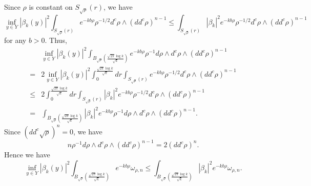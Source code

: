 \documentclass[12pt,oneside]{amsart}
\theoremstyle{plain}
\theoremstyle{definition}
\theoremstyle{remark}
\begin{document}
Since $\rho$ is constant on $S_{\sqrt{\rho}}(r)$, we have 
\[
\inf_{y \in Y} |\beta_{k}(y)|^2 \int_{S_{\sqrt{\rho}}(r)} e^{-kb\rho} \rho^{-1/2}d^{c} \rho \wedge (dd^c \rho)^{n-1} \leq \int_{S_{\sqrt{\rho}}(r)} |\beta_{k}|^2 e^{-k b\rho} \rho^{-1/2}d^c \rho \wedge (dd^c \rho)^{n-1} 
\]
for any $b > 0$.  
Thus, 
\begin{align*}
& \inf_{y \in Y} |\beta_{k}(y)|^2 \int_{B_{\sqrt{\rho}}(\frac{\sqrt{2\pi}\log k}{\sqrt{k}})} e^{-kb\rho} \rho^{-1}d\rho \wedge d^{c} \rho \wedge (dd^c \rho)^{n-1} \\
= & 2\inf_{y \in Y} |\beta_{k}(y)|^2 \int_{0}^{\frac{\sqrt{2\pi}\log k}{\sqrt{k}}} dr \int_{S_{\sqrt{\rho}}(r)} e^{-kb\rho} \rho^{-1/2} d^c \rho \wedge (dd^c \rho)^{n-1} \\
\leq & 2\int_{0}^{\frac{\sqrt{2\pi}\log k}{\sqrt{k}}} dr \int_{S_{\sqrt{\rho}}(r)} |\beta_{k}|^2 e^{-kb\rho}\rho^{-1/2} d^c \rho \wedge (dd^c \rho)^{n-1} \\
= & \int_{B_{\sqrt{\rho}}(\frac{\sqrt{2\pi}\log k}{\sqrt{k}})} |\beta_{k}|^2 e^{-kb\rho} \rho^{-1} d\rho \wedge d^c \rho \wedge (dd^{c}\rho)^{n-1}.  
\end{align*}
Since $(dd^c \sqrt{\rho})^n = 0$, 
we have 
\[
n \rho^{-1}d\rho \wedge d^c \rho \wedge (dd^c \rho)^{n-1} =  2 (dd^c \rho)^n.
\]
Hence we have 
\begin{equation}\label{equation:11}
\inf_{y \in Y} |\beta_{k}(y)|^2 \int_{B_{\sqrt{\rho}}(\frac{\sqrt{2\pi}\log k}{\sqrt{k}})} e^{-kb\rho} \omega_{\rho, n} 
\leq \int_{B_{\sqrt{\rho}}(\frac{\sqrt{2\pi}\log k}{\sqrt{k}})} |\beta_{k}|^2 e^{-kb\rho} \omega_{\rho, n}.
\end{equation}
\end{document}
